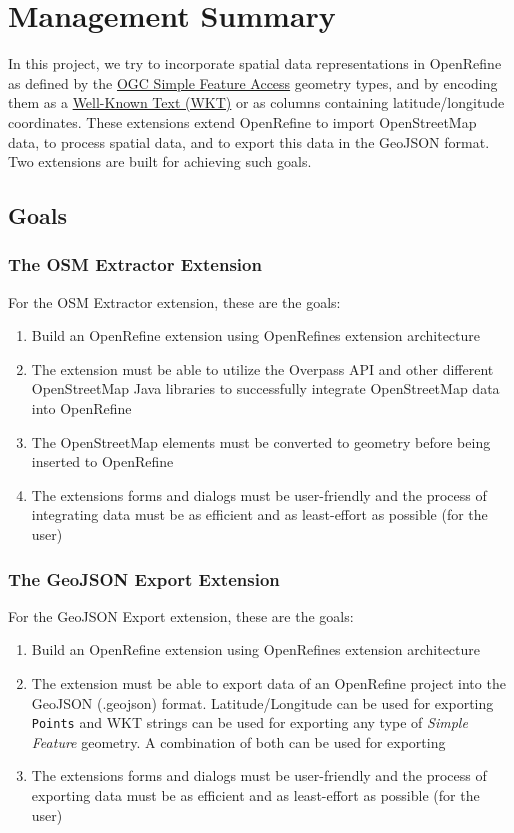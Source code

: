 \chapter*{Management Summary}
In this project, we try to incorporate spatial data representations in OpenRefine as defined by the \href{https://www.ogc.org/standards/sfa}{OGC Simple Feature Access} geometry types, and by encoding them as a \href{https://www.ogc.org/standards/wkt-crs}{Well-Known Text (WKT)} or as columns containing latitude/longitude coordinates. These extensions extend OpenRefine to import OpenStreetMap data, to process spatial data, and to export this data in the GeoJSON format.
Two extensions are built for achieving such goals.
\section*{Goals}
\subsection*{The OSM Extractor Extension}
For the OSM Extractor extension, these are the goals:
\begin{enumerate}
    \item Build an OpenRefine extension using OpenRefine\textquotesingle s extension architecture
    \item The extension must be able to utilize the Overpass API and other different OpenStreetMap Java libraries to successfully
    integrate OpenStreetMap data into OpenRefine
    \item The OpenStreetMap elements must be converted to  geometry before being inserted to OpenRefine
    \item The extension\textquotesingle s forms and dialogs must be user-friendly and the process of integrating data must be as efficient
    and as least-effort as possible (for the user)
\end{enumerate}
\subsection*{The GeoJSON Export Extension}
For the GeoJSON Export extension, these are the goals:
\begin{enumerate}
    \item Build an OpenRefine extension using OpenRefine\textquotesingle s extension architecture
    \item The extension must be able to export data of an OpenRefine project into the GeoJSON (.geojson) format. Latitude/Longitude
    can be used for exporting \texttt{Points} and WKT strings can be used for exporting any type of \textit{Simple Feature} geometry.
    A combination of both can be used for exporting
    \item The extension\textquotesingle s forms and dialogs must be user-friendly and the process of exporting data must be as efficient
    and as least-effort as possible (for the user)
\end{enumerate}
\pagebreak
